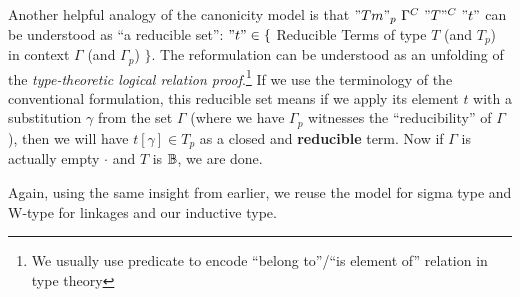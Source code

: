 Another helpful analogy of the canonicity model is that $"Tm"_p~\Gamma^C~"T"^C~"t"$ can be understood as ``a reducible set'': $"t" \in \{$ Reducible Terms of type $T$ (and $T_p$) in context $\Gamma$ (and $\Gamma_p$) $\}$. The reformulation can be understood as an unfolding of the \textit{type-theoretic logical relation proof}.\footnote{We usually use predicate to encode ``belong to''/``is element of'' relation in type theory} If we use the terminology of the conventional formulation, this reducible set means if we apply its element $t$ with a substitution $\gamma$ from the set $\Gamma$ (where we have $\Gamma_p$ witnesses the ``reducibility'' of $\Gamma$), then we will have $t[\gamma] \in T_p$ as a closed and \textbf{reducible} term. Now if $\Gamma$ is actually empty $\cdot$ and $T$ is $\mathbb{B}$, we are done. 

Again, using the same insight from earlier, we reuse the model for sigma type and W-type for linkages and our inductive type.

